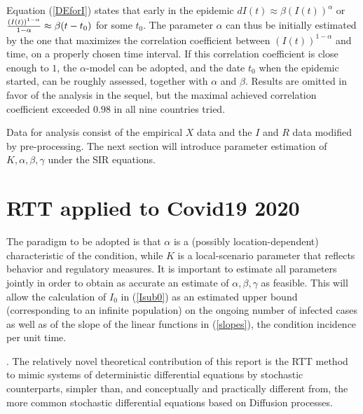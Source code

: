 \documentclass{article}
\begin{document}
\bigskip

Equation (\ref{DEforI}) states that early in the epidemic $dI(t) \approx \beta (I(t))^\alpha$ or ${{(I(t))^{1-\alpha}} \over  {1-\alpha}} \approx \beta (t-t_0)$ for some $t_0$.
The parameter $\alpha$ can thus be initially estimated by the one that maximizes the correlation coefficient between $(I(t))^{1-\alpha}$ and time, on a properly chosen time interval. If this correlation coefficient is close enough to $1$, the $\alpha$-model can be adopted, and the date $t_0$ when the epidemic started, can be roughly assessed, together with $\alpha$ and $\beta$. Results are omitted in favor of the analysis in the sequel, but
the maximal achieved correlation coefficient exceeded $0.98$ in all nine countries tried.

\bigskip

Data for analysis consist of the empirical $X$ data and the $I$ and $R$ data modified by pre-processing. The next section will introduce parameter estimation of $K,\alpha, \beta,\gamma$ under the SIR equations.

\section{RTT applied to Covid19 2020} \label{RTTsection}

The paradigm to be adopted is that $\alpha$ is a (possibly location-dependent) characteristic of the condition, while $K$ is a local-scenario parameter that reflects behavior and regulatory measures. It is important to estimate all parameters jointly in order to obtain as accurate an estimate of $\alpha, \beta, \gamma$ as feasible. This will allow the calculation of $I_0$ in (\ref{Isub0}) as an estimated upper bound (corresponding to an infinite population) on the ongoing number of infected cases as well as of the slope of the linear functions in (\ref{slopes}), the condition incidence per unit time.

\bigskip

. The relatively novel theoretical contribution of this report is the RTT method to mimic systems of deterministic differential equations by stochastic counterparts, simpler than, and conceptually and practically different from, the more common stochastic differential equations based on Diffusion processes.
\end{document}
